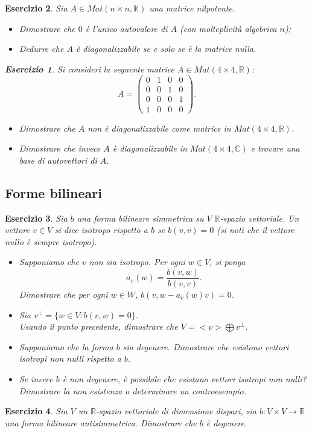 \documentclass{article}
\newtheorem{es}{Esercizio}
\begin{document}
{\begin{es}
       Sia $A\in Mat(n \times n, \mathbb{K})$ una matrice nilpotente.
    \begin{itemize}
        \item Dimostrare che $0$ è l'unico autovalore di $A$ (con molteplicità algebrica $n$);
    \item Dedurre che $A$ è diagonalizzabile se e solo se è la matrice nulla.
    \end{itemize}
    \begin{es}
        Si consideri la seguente matrice $A\in Mat(4 \times 4, \mathbb{R})$:
        $$
        A=\begin{pmatrix}
            0 & 1 & 0 & 0\\
            0 & 0 & 1 & 0\\
            0 & 0 & 0 & 1\\
            1 & 0 & 0 & 0
        \end{pmatrix}.
        $$
        \begin{itemize}
            \item Dimostrare che $A$ non è diagonalizzabile come matrice in $Mat(4 \times 4, \mathbb{R})$.
            \item Dimostrare che invece $A$ è diagonalizzabile in $Mat(4 \times 4, \mathbb{C})$ e trovare una base di autovettori di $A$.
        \end{itemize}
    \end{es}
\end{es}

\subsection{Forme bilineari}
\begin{es}
    Sia $b$ una forma bilineare simmetrica su $V$ $\mathbb{K}$-spazio vettoriale. Un vettore $v\in V$ si dice isotropo rispetto a $b$ se $b(v,v)=0$ (si noti che il vettore nullo è sempre isotropo).
    \begin{itemize}
        \item Supponiamo che $v$ non sia isotropo. Per ogni $w\in V$, si ponga $$ a_v(w)=\frac{b(v,w)}{b(v,v)}.
        $$
        Dimostrare che per ogni $w\in W$, $b(v,w-a_v(w)v)=0$.
        \item Sia $v^\perp=\{w\in V:b(v,w)=0\}$. \\
        Usando il punto precedente, dimostrare che $V=<v>\bigoplus v^\perp$.
        \item Supponiamo che la forma $b$ sia degenere. Dimostrare che esistono vettori isotropi non nulli rispetto a $b$.\\
    \item Se invece $b$ è non degenere, è possibile che esistano vettori isotropi non nulli? Dimostrare la non esistenza o determinare un controesempio.
    \end{itemize}
\end{es}
\begin{es}
    Sia $V$ un $\mathbb{R}$-spazio vettoriale di dimensione dispari, sia $b:V\times V\to \mathbb{R}$ una forma bilineare antisimmetrica. Dimostrare che $b$ è degenere.
\end{es}



}
\end{document}
